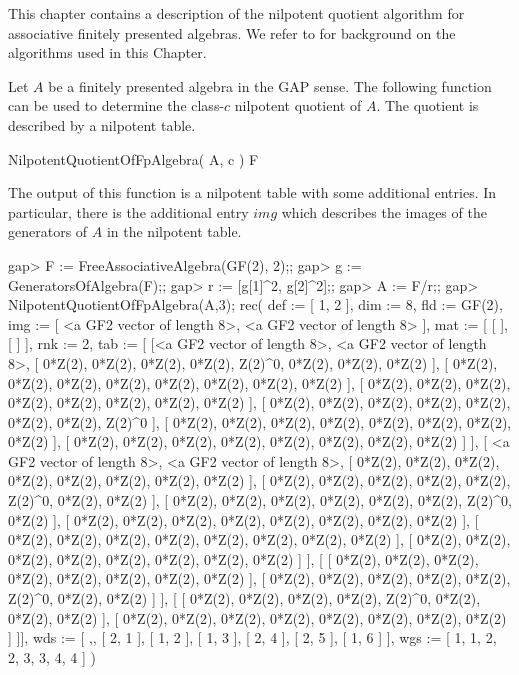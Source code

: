 

This chapter contains a description of the nilpotent quotient algorithm
for associative finitely presented algebras. We refer to \cite{Eic11} for 
background on the algorithms used in this Chapter.


Let $A$ be a finitely presented algebra in the GAP sense. The following
function can be used to determine the class-$c$ nilpotent quotient of $A$.
The quotient is described by a nilpotent table.

\> NilpotentQuotientOfFpAlgebra( A, c ) F

The output of this function is a nilpotent table with some additional
entries. In particular, there is the additional entry $img$ which 
describes the images of the generators of $A$ in the nilpotent table.


\beginexample
gap> F := FreeAssociativeAlgebra(GF(2), 2);;
gap> g := GeneratorsOfAlgebra(F);;
gap> r := [g[1]^2, g[2]^2];;
gap> A := F/r;;
gap> NilpotentQuotientOfFpAlgebra(A,3);
rec( def := [ 1, 2 ], dim := 8, fld := GF(2), 
  img := [ <a GF2 vector of length 8>, <a GF2 vector of length 8> ], 
  mat := [ [  ], [  ] ], rnk := 2, 
  tab := 
    [ [<a GF2 vector of length 8>, <a GF2 vector of length 8>, 
        [ 0*Z(2), 0*Z(2), 0*Z(2), 0*Z(2), Z(2)^0, 0*Z(2), 0*Z(2), 0*Z(2) ], 
        [ 0*Z(2), 0*Z(2), 0*Z(2), 0*Z(2), 0*Z(2), 0*Z(2), 0*Z(2), 0*Z(2) ], 
        [ 0*Z(2), 0*Z(2), 0*Z(2), 0*Z(2), 0*Z(2), 0*Z(2), 0*Z(2), 0*Z(2) ], 
        [ 0*Z(2), 0*Z(2), 0*Z(2), 0*Z(2), 0*Z(2), 0*Z(2), 0*Z(2), Z(2)^0 ], 
        [ 0*Z(2), 0*Z(2), 0*Z(2), 0*Z(2), 0*Z(2), 0*Z(2), 0*Z(2), 0*Z(2) ], 
        [ 0*Z(2), 0*Z(2), 0*Z(2), 0*Z(2), 0*Z(2), 0*Z(2), 0*Z(2), 0*Z(2) ] ], 
      [ <a GF2 vector of length 8>, <a GF2 vector of length 8>, 
        [ 0*Z(2), 0*Z(2), 0*Z(2), 0*Z(2), 0*Z(2), 0*Z(2), 0*Z(2), 0*Z(2) ], 
        [ 0*Z(2), 0*Z(2), 0*Z(2), 0*Z(2), 0*Z(2), Z(2)^0, 0*Z(2), 0*Z(2) ], 
        [ 0*Z(2), 0*Z(2), 0*Z(2), 0*Z(2), 0*Z(2), 0*Z(2), Z(2)^0, 0*Z(2) ], 
        [ 0*Z(2), 0*Z(2), 0*Z(2), 0*Z(2), 0*Z(2), 0*Z(2), 0*Z(2), 0*Z(2) ], 
        [ 0*Z(2), 0*Z(2), 0*Z(2), 0*Z(2), 0*Z(2), 0*Z(2), 0*Z(2), 0*Z(2) ], 
        [ 0*Z(2), 0*Z(2), 0*Z(2), 0*Z(2), 0*Z(2), 0*Z(2), 0*Z(2), 0*Z(2) ] ], 
      [ [ 0*Z(2), 0*Z(2), 0*Z(2), 0*Z(2), 0*Z(2), 0*Z(2), 0*Z(2), 0*Z(2) ], 
        [ 0*Z(2), 0*Z(2), 0*Z(2), 0*Z(2), 0*Z(2), Z(2)^0, 0*Z(2), 0*Z(2) ] ], 
      [ [ 0*Z(2), 0*Z(2), 0*Z(2), 0*Z(2), Z(2)^0, 0*Z(2), 0*Z(2), 0*Z(2) ], 
        [ 0*Z(2), 0*Z(2), 0*Z(2), 0*Z(2), 0*Z(2), 0*Z(2), 0*Z(2), 0*Z(2) ] ]], 
  wds := [ ,, [ 2, 1 ], [ 1, 2 ], [ 1, 3 ], [ 2, 4 ], [ 2, 5 ], [ 1, 6 ] ], 
  wgs := [ 1, 1, 2, 2, 3, 3, 4, 4 ] )
\endexample
